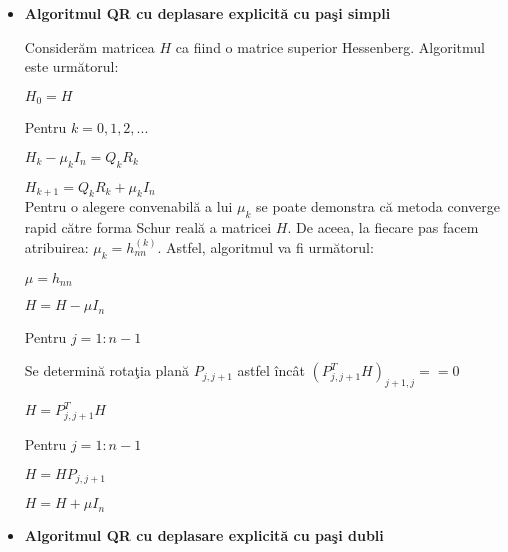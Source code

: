 \documentclass{exam}
\begin{document}
\begin{itemize}
	\item {\textbf{Algoritmul QR cu deplasare explicită cu paşi simpli}}

	      Considerăm matricea $H$ ca fiind o matrice superior Hessenberg. Algoritmul este următorul:

	      \hspace{5 mm} $ H_{0} = H $

	      \hspace{5 mm} Pentru $k = 0, 1, 2, ...$

	      \hspace{5 mm} \hspace{5 mm} $H_{k} - \mu _{k} I_{n} = Q_{k} R_{k}$

	      \hspace{5 mm} \hspace{5 mm} $H_{k+1} = Q_{k} R_{k} + \mu _{k} I_{n}$
	      \\


	      Pentru o alegere convenabilă a lui $\mu_{k}$ se poate demonstra că metoda converge rapid către forma Schur reală a matricei $H$. De aceea, la fiecare pas facem atribuirea: $\mu_{k} = h_{nn}^{(k)}$. Astfel, algoritmul va fi următorul:

	      \hspace{5 mm} $ \mu = h_{nn} $

	      \hspace{5 mm} $ H = H - \mu I_{n} $

	      \hspace{5 mm} Pentru $j = 1 : n - 1 $

	      \hspace{5 mm} \hspace{5 mm} Se determină rotaţia plană $P_{j, j+1}$ astfel încât $ (P_{j, j+1}^{T} H)_{j+1, j} == 0$

	      \hspace{5 mm} \hspace{5 mm} $H = P_{j, j+1}^{T} H$

	      \hspace{5 mm} Pentru $j = 1 : n - 1 $

	      \hspace{5 mm} \hspace{5 mm} $H = H P_{j, j+1}$

	      \hspace{5 mm} $H = H + \mu I_{n}$
	      \\


	\item {\textbf{Algoritmul QR cu deplasare explicită cu paşi dubli}}


\end{itemize}
\end{document}
